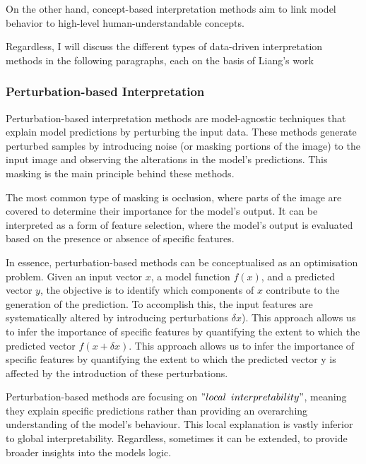 On the other hand, concept-based interpretation methods aim to link model behavior to high-level human-understandable concepts.

Regardless, I will discuss the different types of data-driven interpretation methods in the following paragraphs, each on the basis of Liang's work~\cite{LIANG2021168}

\subsubsection{Perturbation-based Interpretation}\label{subsubsec:pertubation-based-interpretation}

Perturbation-based interpretation methods are model-agnostic techniques that explain model predictions by perturbing the input data.
These methods generate perturbed samples by introducing noise (or masking portions of the image) to the input image and observing the alterations in the model's predictions.
This masking is the main principle behind these methods.

The most common type of masking is occlusion, where parts of the image are covered to determine their importance for the model's output.
It can be interpreted as a form of feature selection, where the model's output is evaluated based on the presence or absence of specific features.

In essence, perturbation-based methods can be conceptualised as an optimisation problem.
Given an input vector \( x \), a model function \( f(x) \), and a predicted vector \( y \),
the objective is to identify which components of \( x \) contribute to the generation of the prediction. To accomplish this, the input features are systematically altered by introducing perturbations \( \delta x \)).
This approach allows us to infer the importance of specific features by quantifying the extent to which the predicted vector \( f(x + \delta x) \).
This approach allows us to infer the importance of specific features by quantifying the extent to which the predicted vector y is affected by the introduction of these perturbations.



Perturbation-based methods are focusing on \("local\) \(interpretability"\), meaning they explain specific predictions rather than providing an overarching understanding of the model’s behaviour.
This local explanation is vastly inferior to global interpretability.
Regardless, sometimes it can be extended, to provide broader insights into the models logic.

